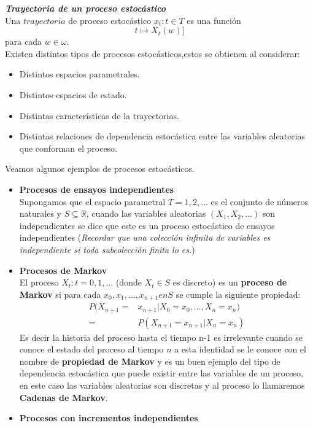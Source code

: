 \documentclass[10pt,a4paper]{article}
\theoremstyle{definition}
\theoremstyle{remark}
\newcommand{\ds}{\displaystyle}
\begin{document}
\begin{multicols}{2}
\textbf{\textit{Trayectoria de un proceso estocástico}}\\
Una $trayectoria$ de proceso estocástico $x_{t}: t \in T$ es una función $$t 
\longmapsto X_{t}(w)]$$ para cada $w \in \omega.$\\
Existen distintos tipos de procesos estocásticos,estos se obtienen al considerar:
\begin{itemize}
	\item Distintos espacios parametrales.
	\item Distintos espacios de estado.
	\item Distintas características de la trayectorias.
	\item Distintas relaciones de dependencia estocástica entre las variables aleatorias 
	que conforman el proceso.
\end{itemize}
Veamos algunos ejemplos de procesos estocásticos.
\begin{itemize}
	\item \textbf{Procesos de ensayos independientes}\\
	Supongamos que el espacio parametral $T={1,2,\dots}$ es el conjunto de números 
	naturales y $\ds{S \subseteq \mathbb{R}}$, cuando las variables aleatorias $\ds{       (X_{1},X_{2},\dots)}$ son independientes se dice que este es un proceso estocástico de
	ensayos independientes (\textit{Recordar que una colección infinita de variables es independiente si toda subcolección finita lo es.})\\
	\item \textbf{Procesos de Markov} \\
	El proceso ${X_{t}: t=0,1,\dots}$ (donde $X_{t} \in S$ es discreto) es un 
	\textbf{proceso de Markov} si para cada $x_0,x_1,\dots,x_{n+1} en S$ se cumple la 
	siguiente propiedad:
	\begin{align*}
	P(X_{n+1}=& x_{n+1}|X_0=x_0,\dots,X_n=x_n)\\
	=& P(X_{n+1}=x_{n+1}|X_{n}=x_n)
	\end{align*}
	Es decir la historia del proceso hasta el tiempo n-1 es irrelevante cuando se conoce 
	el estado del proceso al tiempo $n$ a esta identidad se le conoce con el nombre de 
	\textbf{propiedad de Markov} y es un buen ejemplo del tipo de 
	dependencia estocástica que puede existir entre las variables de un proceso, en este 
	caso las variables aleatorias son discretas y al proceso lo llamaremos 
	\textbf{Cadenas de Markov}.\\
	\item \textbf{Procesos con incrementos independientes} \\

\end{itemize}
\end{multicols}
\end{document}
